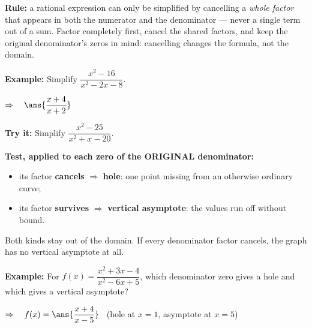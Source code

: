 \documentclass[12pt]{article}
\begin{document}


\begin{formulabox}
\textbf{Rule:} a rational expression can only be simplified by cancelling a
\emph{whole factor} that appears in both the numerator and the denominator ---
never a single term out of a sum. Factor completely first, cancel the shared
factors, and keep the original denominator's zeros in mind: cancelling changes
the formula, not the domain.
\end{formulabox}

\begin{examplebox}
\textbf{Example:} \quad Simplify $\dfrac{x^2-16}{x^2-2x-8}$.

$\Rightarrow\quad \ans{\dfrac{x+4}{x+2}}$
\end{examplebox}

\begin{tryitbox}
\textbf{Try it:} \quad Simplify $\dfrac{x^2-25}{x^2+x-20}$.\\[2pt]
\end{tryitbox}


\begin{formulabox}
\textbf{Test, applied to each zero of the ORIGINAL denominator:}
\begin{itemize}[leftmargin=1.2cm, itemsep=1pt, topsep=2pt]
  \item its factor \textbf{cancels} $\Rightarrow$ \textbf{hole}: one point missing from an otherwise ordinary curve;
  \item its factor \textbf{survives} $\Rightarrow$ \textbf{vertical asymptote}: the values run off without bound.
\end{itemize}
Both kinds stay out of the domain. If every denominator factor cancels, the graph
has no vertical asymptote at all.
\end{formulabox}

\begin{examplebox}
\textbf{Example:} \quad For $f(x) = \dfrac{x^2+3x-4}{x^2-6x+5}$, which denominator
zero gives a hole and which gives a vertical asymptote?

$\Rightarrow\quad f(x) = \ans{\dfrac{x+4}{x-5}}$ \ (hole at $x=1$, asymptote at $x=5$)
\end{examplebox}
\end{document}
